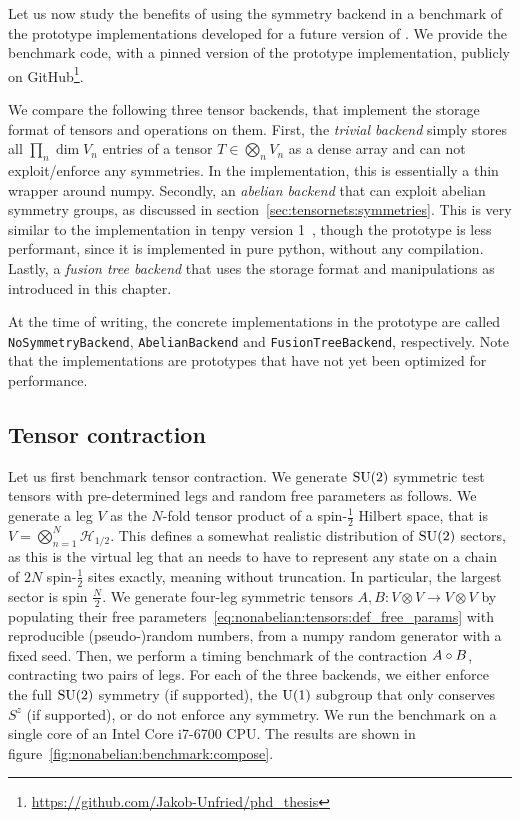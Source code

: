 Let us now study the benefits of using the symmetry backend in a benchmark of the prototype implementations developed for a future version of .
%
We provide the benchmark code, with a pinned version of the prototype implementation, publicly on GitHub\footnote{\url{https://github.com/Jakob-Unfried/phd_thesis}}.

%
We compare the following three tensor backends, that implement the storage format of tensors and operations on them.
%
First, the \emph{trivial backend} simply stores all $\prod_n \dim V_n$ entries of a tensor $T \in \bigotimes_n V_n$ as a dense array and can not exploit/enforce any symmetries.
%
In the implementation, this is essentially a thin wrapper around numpy.
%
Secondly, an \emph{abelian backend} that can exploit abelian symmetry groups, as discussed in section~\ref{sec:tensornets:symmetries}.
%
This is very similar to the implementation in tenpy version 1~\cite{tenpySoftware}, though the prototype is less performant, since it is implemented in pure python, without any compilation.
%
Lastly, a \emph{fusion tree backend} that uses the storage format and manipulations as introduced in this chapter.


At the time of writing, the concrete implementations in the prototype are called \texttt{NoSymmetryBackend}, \texttt{AbelianBackend} and \texttt{FusionTreeBackend}, respectively.
%
Note that the implementations are prototypes that have not yet been optimized for performance.


\subsection{Tensor contraction}

Let us first benchmark tensor contraction.
%
We generate $\mathrm{SU}(2)$ symmetric test tensors with pre-determined legs and random free parameters as follows.
%
We generate a leg $V$ as the $N$-fold tensor product of a spin-$\tfrac{1}{2}$ Hilbert space, that is $V = \bigotimes_{n=1}^N \mathcal{H}_{1/2}$.
%
This defines a somewhat realistic distribution of $\mathrm{SU}(2)$ sectors, as this is the virtual leg that an  needs to have to represent any state on a chain of $2N$ spin-$\tfrac{1}{2}$ sites exactly, meaning without truncation.
%
In particular, the largest sector is spin $\tfrac{N}{2}$.
%
We generate four-leg symmetric tensors $A, B : V \otimes V \to V \otimes V$ by populating their free parameters~\eqref{eq:nonabelian:tensors:def_free_params} with reproducible (pseudo-)random numbers, from a numpy random generator with a fixed seed.
%
Then, we perform a timing benchmark of the contraction $A \circ B$, contracting two pairs of legs.
%
For each of the three backends, we either enforce the full $\mathrm{SU}(2)$ symmetry (if supported), the $\mathrm{U}(1)$ subgroup that only conserves $S^z$ (if supported), or do not enforce any symmetry.
%
We run the benchmark on a single core of an Intel Core i7-6700 CPU.
%
The results are shown in figure~\ref{fig:nonabelian:benchmark:compose}.


